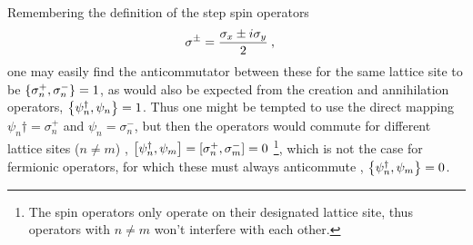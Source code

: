 \documentclass[../main.tex]{subfiles} %
\begin{document}
Remembering the definition of the step spin operators \cite{sakurai_modernQM_2017}
\begin{align} \index{sigmaplus@$\sigma^+$}\index{sigmaminus@$\sigma^-$}
    \sigma^\pm &= \frac{\sigma_x \pm i \sigma_y}{2} \: ,
\end{align}
one may easily find the anticommutator between these for the same lattice site to be $\anticommutator{\sigma_n^+}{\sigma_n^-} = 1$, as would also be expected from the creation and annihilation operators, $\anticommutator{\psi_n\dagger}{\psi_n} = 1$. Thus one might be tempted to use the direct mapping $\psi_n\dagger = \sigma_n^+$ and $\psi_n = \sigma_n^-$, but then the operators would commute for different lattice sites ($n \ne m$) \cite{susskind_latticeFermions_1977}, $\commutator{\psi_n\dagger}{\psi_m} = \commutator{\sigma_n^+}{\sigma_m^-} = 0$ \footnote{The spin operators only operate on their designated lattice site, thus operators with $n \ne m$ won't interfere with each other.}, which is not the case for fermionic operators, for which these must always anticommute \cite{sakurai_modernQM_2017}, $\anticommutator{\psi_n\dagger}{\psi_m} = 0$.
\end{document}
